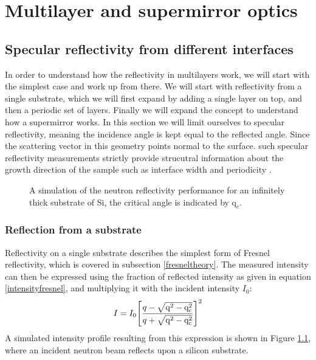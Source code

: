 \chapter{Multilayer and supermirror optics}\label{multilayeroptics}
\section{Specular reflectivity from different interfaces}
In order to understand how the reflectivity in multilayers work, we will start with the simplest case and work up from there. We will start with reflectivity from a single substrate, which we will first expand by adding a single layer on top, and then a periodic set of layers. Finally we will expand the concept to understand how a supermirror works. In this section we will limit ourselves to specular reflectivity, meaning the incidence angle is kept equal to the reflected angle. Since the scattering vector in this geometry points normal to the surface. such specular reflectivity measurements strictly provide strucutral information about the growth direction of the sample such as interface width and periodicity \cite{specular_reflectivity_stierle}.
\begin{figure}
	\centering
	\def\svgwidth{\textwidth}
	
	\caption{A simulation of the neutron reflectivity performance for an infinitely thick substrate of Si, the critical angle is indicated by $\textrm{q}_c$.}
	\label{simulated_substrate}
\end{figure}
\subsection{Reflection from a substrate}
Reflectivity on a single substrate describes the simplest form of Fresnel reflectivity, which is covered in subsection \ref{fresneltheory}. The measured intensity can then be expressed using the fraction of reflected intensity as given in equation \ref{intensityfresnel}, and multiplying it with the incident intensity $I_0$:
\begin{equation}\label{totalintensitysubstrate}
	I = I_0  \qty [\frac{q- \sqrt{\textrm{q}^2 - \textrm{q}_c^2}}{q+ \sqrt{\textrm{q}^2 - \textrm{q}_c^2}}]^2 
\end{equation}
A simulated intensity profile resulting from this expression is shown in Figure \ref{simulated_substrate}, where an incident neutron beam reflects upon a silicon substrate. 
